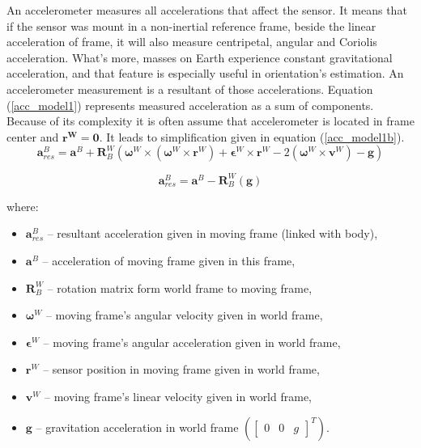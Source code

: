 An accelerometer measures all accelerations that affect the sensor. It means that if the sensor was mount in a non-inertial reference frame, beside the linear acceleration of frame, it will also measure centripetal, angular and Coriolis acceleration. What's more, masses on Earth experience constant gravitational acceleration, and that feature is especially useful in orientation's estimation. An accelerometer measurement is a resultant of those accelerations. Equation (\ref{acc_model1}) represents measured acceleration as a sum of components. Because of its complexity it is often assume that accelerometer is located in frame center and $\bm{r^W} = \bm{0}$. It leads to simplification given in equation (\ref{acc_model1b}).
\\
\begin{equation}
	\bm{a}_{res}^B = \bm{a}^B + \bm{R}^W_B \left( \bm{\omega}^W \times \left( \bm{\omega}^W \times \bm{r}^W \right) + \bm{\epsilon}^W \times \bm{r}^W - 2\left( \bm{\omega}^W \times \bm{v}^W \right) - \bm{g}  \right)  
	\label{acc_model1}
\end{equation}

\begin{equation}
	\bm{a}_{res}^B = \bm{a}^B - \bm{R}^W_B \left( \bm{g}  \right)  
	\label{acc_model1b}
\end{equation}

where:
\begin{itemize}
	\item $\bm{a}_{res}^B$ -- resultant acceleration given in moving frame (linked with body),
	\item $\bm{a}^B$ -- acceleration of moving frame given in this frame,
	\item $\bm{R}^W_B$ -- rotation matrix form world frame to moving frame,
	\item $\bm{\omega}^W$ -- moving frame's angular velocity given in world frame,
	\item $\bm{\epsilon}^W$ -- moving frame's angular acceleration given in world frame,
	\item $\bm{r}^W$ -- sensor position in moving frame given in world frame,
	\item $\bm{v}^W$ -- moving frame's linear velocity given in world frame,
	\item $\bm{g}$ -- gravitation acceleration in world frame $\left(\begin{bmatrix}
		0 &  0 &  g
	\end{bmatrix}^T \right)$.
	
\end{itemize}

